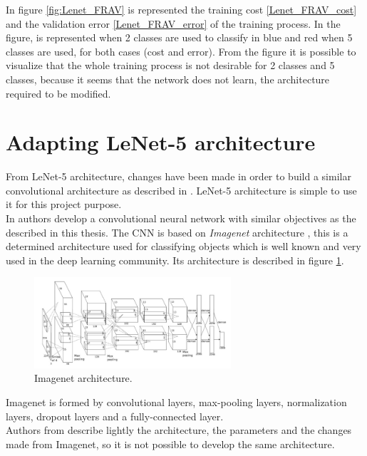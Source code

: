 In figure \ref{fig:Lenet_FRAV} is represented the training cost \ref{Lenet_FRAV_cost} and the validation error \ref{Lenet_FRAV_error} of the training process. In the figure, is represented when 2 classes are used to classify in  blue and red when 5 classes are used, for both cases (cost and error). From the figure it is possible to visualize that the whole training process is not desirable for 2 classes and 5 classes, because it seems that the network does not learn, the architecture required to be modified.

\section{Adapting LeNet-5 architecture}
From LeNet-5 architecture, changes have been made in order to build a similar convolutional architecture as described in \cite{yangLL14}. LeNet-5 architecture is simple to use it for this project purpose.\\

In \cite{yangLL14} authors develop a convolutional neural network with similar objectives as the described in this thesis. The CNN is based on \textit{Imagenet} architecture \cite{imagenet}, this is a determined architecture used for classifying objects which is well known and very used in the deep learning community. Its architecture is described in figure \ref{fig:Imagenet_architecture}.\\

\begin{figure}[htb]
\centering
\includegraphics[width=0.65\textwidth]{images_miscelaneus/Imagenet.png}
\caption{Imagenet architecture.} \label{fig:Imagenet_architecture}
\end{figure}

Imagenet is formed by convolutional layers, max-pooling layers, normalization layers, dropout layers and a fully-connected layer.\\

Authors from \cite{yangLL14} describe lightly the architecture, the parameters and the changes made from Imagenet, so it is not possible to develop the same architecture.

